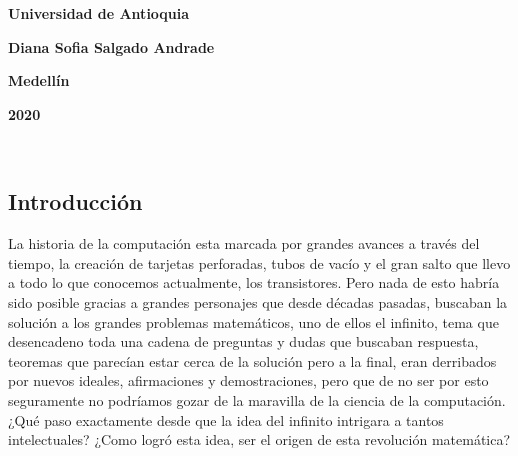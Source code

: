 \documentclass[12pt]{article}
\begin{document}
\begin{center}
\bf{\sc\Huge Universidad de Antioquia}\\
\end{center}
\vspace{120pt}
\begin{center}
\bf{\sc\Huge Diana Sofia Salgado Andrade }\\
\end{center}
\vspace{200pt}
\begin{center}
\bf{\sc\Huge Medellín}
\end{center}
\begin{center}
\bf{\sc\Huge 2020}\\
\end{center}\
\newpage



\begin{center}

\section{ Introducción}
\end{center}
\begin{flushleft}
\vspace{25PT}
\large
La historia de la computación esta marcada por grandes avances a través del tiempo, la creación de tarjetas perforadas, tubos de vacío y el gran salto que llevo a todo lo que conocemos actualmente, los transistores. Pero  nada de esto habría sido posible gracias a grandes personajes que desde décadas pasadas, buscaban la solución a los grandes problemas matemáticos, uno de ellos el infinito, tema que desencadeno toda una cadena de preguntas y dudas que buscaban respuesta, teoremas que parecían estar cerca de la solución pero a la final, eran derribados por nuevos ideales, afirmaciones y demostraciones, pero que de no ser por esto seguramente no podríamos gozar de la maravilla de la ciencia de la computación. ¿Qué paso exactamente desde que la idea del infinito intrigara a tantos intelectuales?  ¿Como logró esta idea, ser el origen de esta revolución matemática?
\end{flushleft}
\newpage
\end{document}
